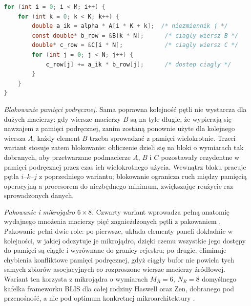 \documentclass[a4paper,12pt]{book} %
\begin{document}
\begin{lstfloat}[t!]
\begin{lstlisting}[language=C, caption={Mnożenie dwóch macierzy: element \texttt{A[i][k]} wyniesiony przed pętlę wewnętrzną, która przebiega ciągłe elementy wiersza B i wiersza C}, label={lst:gemm-ikj}]
for (int i = 0; i < M; i++) {
    for (int k = 0; k < K; k++) {
        double a_ik = alpha * A[i * K + k];  /* niezmiennik j */
        const double* b_row = &B[k * N];      /* ciagly wiersz B */
        double* c_row = &C[i * N];            /* ciagly wiersz C */
        for (int j = 0; j < N; j++) {
            c_row[j] += a_ik * b_row[j];      /* dostep ciagly */
        }
    }
}
\end{lstlisting}
\end{lstfloat}

\emph{Blokowanie pamięci podręcznej.} Sama poprawna kolejność pętli nie wystarcza dla dużych macierzy: gdy wiersze macierzy $B$ są na tyle długie, że wypierają się nawzajem z pamięci podręcznej, zanim zostaną ponownie użyte dla kolejnego wiersza $A$, każdy element $B$ trzeba sprowadzać z pamięci wielokrotnie. Trzeci wariant stosuje zatem blokowanie: obliczenie dzieli się na bloki o wymiarach tak dobranych, aby przetwarzane podmacierze $A$, $B$ i $C$ pozostawały rezydentne w pamięci podręcznej przez czas ich wielokrotnego użycia. Wewnątrz bloku pracuje pętla $i$--$k$--$j$ z poprzedniego wariantu; blokowanie ogranicza ruch między pamięcią operacyjną a procesorem do niezbędnego minimum, zwiększając reużycie raz sprowadzonych danych.

\emph{Pakowanie i mikrojądro $6 \times 8$.} Czwarty wariant wprowadza pełną anatomię wydajnego mnożenia macierzy pięć zagnieżdżonych pętli z pakowaniem \cite{goto2008anatomy,vanzee2015blis}. Pakowanie pełni dwie role: po pierwsze, układa elementy paneli dokładnie w kolejności, w jakiej odczytuje je mikrojądro, dzięki czemu wszystkie jego dostępy do pamięci są ciągłe i wyrównane do granicy rejestru; po drugie, eliminuje chybienia konfliktowe pamięci podręcznej, gdyż ciągły bufor nie powiela tych samych zbiorów asocjacyjnych co rozproszone wiersze macierzy źródłowej. Wariant ten korzysta z mikrojądra o wymiarach $M_R = 6$, $N_R = 8$ domyślnego kafelka frameworku BLIS dla całej rodziny Haswell oraz Zen, dobranego pod przenośność, a nie pod optimum konkretnej mikroarchitektury \cite{vanzee2015blis}.
\end{document}

